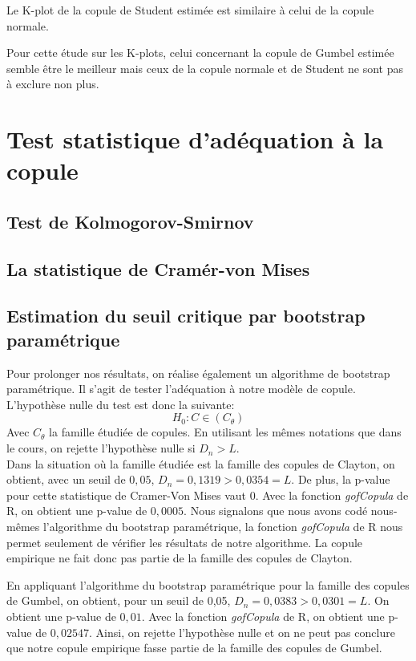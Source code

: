 Le K-plot de la copule de Student estimée est similaire à celui de la copule normale.

Pour cette étude sur les K-plots, celui concernant la copule de Gumbel estimée semble être le meilleur mais ceux de la copule normale et de Student ne sont pas à exclure non plus.

\section{Test statistique d'adéquation à la copule}

\subsection{Test de Kolmogorov-Smirnov}

\subsection{La statistique de Cramér-von Mises}

\subsection{Estimation du seuil critique par bootstrap paramétrique}

Pour prolonger nos résultats, on réalise également un algorithme de bootstrap paramétrique. Il s'agit de tester l'adéquation à notre modèle de copule. L'hypothèse nulle du test est donc la suivante:
$$
H_0 : C \in (C_{\theta})
$$
Avec $C_{\theta}$ la famille étudiée de copules.
En utilisant les mêmes notations que dans le cours, on rejette l'hypothèse nulle si $D_n > L$. \\

Dans la situation où la famille étudiée est la famille des copules de Clayton, on obtient, avec un seuil de $0,05$, $D_n = 0,1319 > 0,0354 = L$. De plus, la p-value pour cette statistique de Cramer-Von Mises vaut $0$. Avec la fonction \textit{gofCopula} de R, on obtient une p-value de $0,0005$. 
Nous signalons que nous avons codé nous-mêmes l'algorithme du bootstrap paramétrique, la fonction \textit{gofCopula} de R nous permet seulement de vérifier les résultats de notre algorithme.
La copule empirique ne fait donc pas partie de la famille des copules de Clayton.

En appliquant l'algorithme du bootstrap paramétrique pour la famille des copules de Gumbel, on obtient, pour un seuil de 0,05, $D_n = 0,0383 > 0,0301 = L$. On obtient une p-value de $0,01$. Avec la fonction \textit{gofCopula} de R, on obtient une p-value de $0,02547$. 
Ainsi, on rejette l'hypothèse nulle et on ne peut pas conclure que notre copule empirique fasse partie de la famille des copules de Gumbel.

